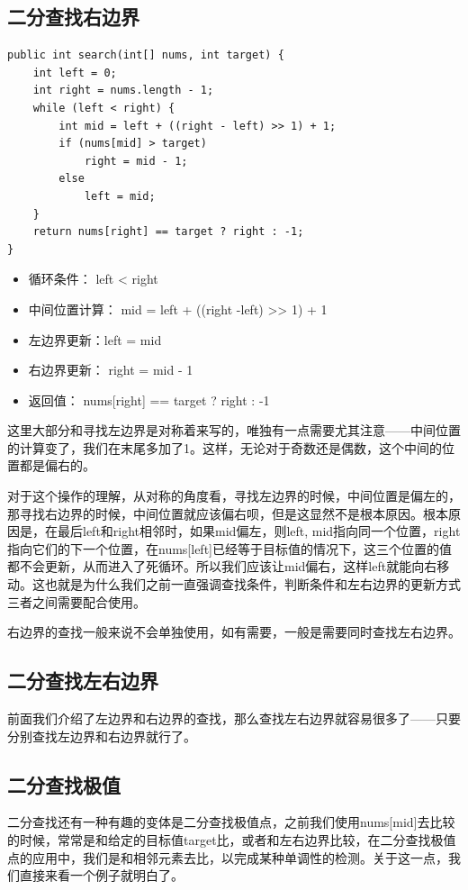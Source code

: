 \documentclass[9pt, b5paaper]{book}
\begin{document}
\subsection{二分查找右边界}
\label{sec-5-1-3}
\begin{verbatim}
public int search(int[] nums, int target) {
    int left = 0;
    int right = nums.length - 1;
    while (left < right) {
        int mid = left + ((right - left) >> 1) + 1;
        if (nums[mid] > target) 
            right = mid - 1;
        else 
            left = mid;
    }
    return nums[right] == target ? right : -1;
}
\end{verbatim}
\begin{itemize}
\item 循环条件： left < right
\item 中间位置计算： mid = left + ((right -left) >> 1) + 1
\item 左边界更新：left = mid
\item 右边界更新： right = mid - 1
\item 返回值： nums[right] == target ? right : -1
\end{itemize}

这里大部分和寻找左边界是对称着来写的，唯独有一点需要尤其注意——中间位置的计算变了，我们在末尾多加了1。这样，无论对于奇数还是偶数，这个中间的位置都是偏右的。

对于这个操作的理解，从对称的角度看，寻找左边界的时候，中间位置是偏左的，那寻找右边界的时候，中间位置就应该偏右呗，但是这显然不是根本原因。根本原因是，在最后left和right相邻时，如果mid偏左，则left, mid指向同一个位置，right指向它们的下一个位置，在nums[left]已经等于目标值的情况下，这三个位置的值都不会更新，从而进入了死循环。所以我们应该让mid偏右，这样left就能向右移动。这也就是为什么我们之前一直强调查找条件，判断条件和左右边界的更新方式三者之间需要配合使用。

右边界的查找一般来说不会单独使用，如有需要，一般是需要同时查找左右边界。

\subsection{二分查找左右边界}
\label{sec-5-1-4}
前面我们介绍了左边界和右边界的查找，那么查找左右边界就容易很多了——只要分别查找左边界和右边界就行了。
\subsection{二分查找极值}
\label{sec-5-1-5}
二分查找还有一种有趣的变体是二分查找极值点，之前我们使用nums[mid]去比较的时候，常常是和给定的目标值target比，或者和左右边界比较，在二分查找极值点的应用中，我们是和相邻元素去比，以完成某种单调性的检测。关于这一点，我们直接来看一个例子就明白了。
\end{document}
